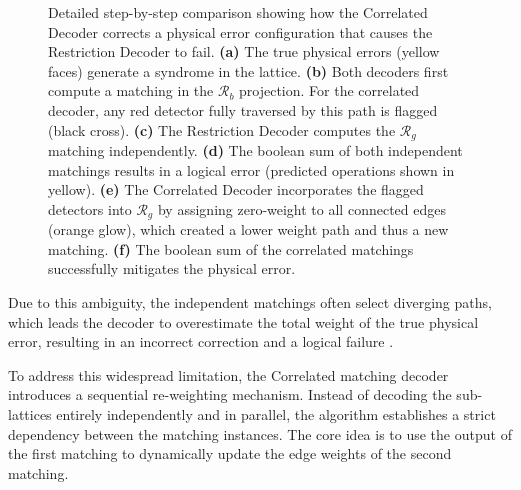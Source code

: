 \begin{figure}[hbt!]
    \caption[Restriction and Correlated Decoding Step-by-step]{Detailed step-by-step comparison showing how the Correlated Decoder corrects a physical error configuration that causes the Restriction Decoder to fail. \textbf{(a)} The true physical errors (yellow faces) generate a syndrome in the lattice. \textbf{(b)} Both decoders first compute a matching in the $\mathcal{R}_b$ projection. For the correlated decoder, any red detector fully traversed by this path is flagged (black cross). \textbf{(c)} The Restriction Decoder computes the $\mathcal{R}_g$ matching independently. \textbf{(d)} The boolean sum of both independent matchings results in a logical error (predicted operations shown in yellow). \textbf{(e)} The Correlated Decoder incorporates the flagged detectors into $\mathcal{R}_g$ by assigning zero-weight to all connected edges (orange glow), which created a lower weight path and thus a new matching. \textbf{(f)} The boolean sum of the correlated matchings successfully mitigates the physical error.}
    \label{fig:correlated_example}
\end{figure}

Due to this ambiguity, the independent matchings often select diverging paths, which leads the decoder to overestimate the total weight of the true physical error, resulting in an incorrect correction and a logical failure \cite{Benhemou_2025}.

 To address this widespread limitation, the Correlated matching decoder \cite{liu2025correlatedmatchingdecoder488} introduces a sequential re-weighting mechanism. Instead of decoding the sub-lattices entirely independently and in parallel, the algorithm establishes a strict dependency between the matching instances. The core idea is to use the output of the first matching to dynamically update the edge weights of the second matching. 

